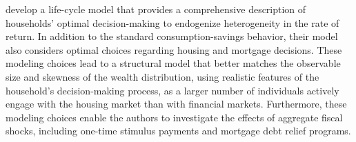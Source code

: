 \par \cite{Guler2022} develop a life-cycle model that provides a comprehensive description of households' optimal decision-making to endogenize heterogeneity in the rate of return. In addition to the standard consumption-savings behavior, their model also considers optimal choices regarding housing and mortgage decisions. These modeling choices lead to a structural model that better matches the observable size and skewness of the wealth distribution, using realistic features of the household's decision-making process, as a larger number of individuals actively engage with the housing market than with financial markets. Furthermore, these modeling choices enable the authors to investigate the effects of aggregate fiscal shocks, including one-time stimulus payments and mortgage debt relief programs.
